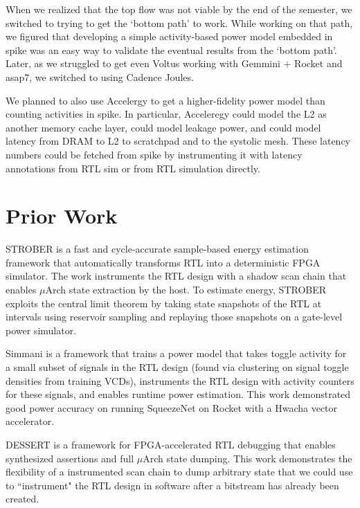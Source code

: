 \documentclass[sigconf]{acmart}
\begin{document}
When we realized that the top flow was not viable by the end of the semester, we switched to trying to get the `bottom path' to work.
While working on that path, we figured that developing a simple activity-based power model embedded in spike was an easy way to validate the eventual results from the `bottom path'.
Later, as we struggled to get even Voltus working with Gemmini + Rocket and asap7, we switched to using Cadence Joules.

We planned to also use Accelergy to get a higher-fidelity power model than counting activities in spike.
In particular, Acceleregy could model the L2 as another memory cache layer, could model leakage power, and could model latency from DRAM to L2 to scratchpad and to the systolic mesh.
These latency numbers could be fetched from spike by instrumenting it with latency annotations from RTL sim or from RTL simulation directly.

\section{Prior Work}
STROBER\cite{strober} is a fast and cycle-accurate sample-based energy estimation framework that automatically transforms RTL into a deterministic FPGA simulator.
The work instruments the RTL design with a shadow scan chain that enables $\mu$Arch state extraction by the host.
To estimate energy, STROBER exploits the central limit theorem by taking state snapshots of the RTL at intervals using reservoir sampling and replaying those snapshots on a gate-level power simulator.

Simmani\cite{simmani} is a framework that trains a power model that takes toggle activity for a small subset of signals in the RTL design (found via clustering on signal toggle densities from training VCDs), instruments the RTL design with activity counters for these signals, and enables runtime power estimation.
This work demonstrated good power accuracy on running SqueezeNet on Rocket with a Hwacha vector accelerator.

DESSERT\cite{dessert} is a framework for FPGA-accelerated RTL debugging that enables synthesized assertions and full $\mu$Arch state dumping.
This work demonstrates the flexibility of a instrumented scan chain to dump arbitrary state that we could use to ``instrument" the RTL design in software after a bitstream has already been created.




\end{document}
